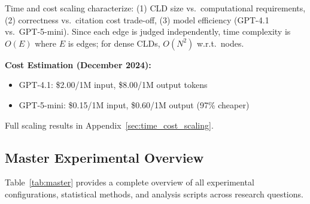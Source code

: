 Time and cost scaling characterize: (1) CLD size vs.\ computational requirements, (2) correctness vs.\ citation cost trade-off, (3) model efficiency (GPT-4.1 vs.\ GPT-5-mini). Since each edge is judged independently, time complexity is $O(E)$ where $E$ is edges; for dense CLDs, $O(N^2)$ w.r.t.\ nodes.

\textbf{Cost Estimation (December 2024):}
\begin{itemize}[noitemsep]
    \item GPT-4.1: \$2.00/1M input, \$8.00/1M output tokens
    \item GPT-5-mini: \$0.15/1M input, \$0.60/1M output (97\% cheaper)
\end{itemize}

Full scaling results in Appendix~\ref{sec:time_cost_scaling}.

\clearpage
\subsection{Master Experimental Overview}
\label{sec:master_experimental_overview}

Table~\ref{tab:master} provides a complete overview of all experimental configurations, statistical methods, and analysis scripts across research questions.

